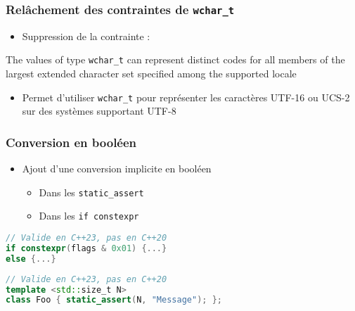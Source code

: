 \documentclass[C++.tex]{subfiles}
\begin{document}
\begin{frame}[fragile]
	\frametitle{Relâchement des contraintes de \lstinline|wchar_t|}
	\begin{itemize}
		\item Suppression de la contrainte :
	\end{itemize}		

	\begin{block}{}
		The values of type \lstinline|wchar_t| can represent distinct codes for all members of the largest extended character set specified among the supported locale
	\end{block}

	\begin{itemize}		
		\item Permet d'utiliser \lstinline|wchar_t| pour représenter les caractères UTF-16 ou UCS-2 sur des systèmes supportant UTF-8

	\end{itemize}
\end{frame}

\begin{frame}[fragile]
	\frametitle{Conversion en booléen}
	\begin{itemize}
		\item Ajout d'une conversion implicite en booléen
		\begin{itemize}
			\item Dans les \lstinline|static_assert|
			\item Dans les \lstinline|if constexpr|
		\end{itemize}
	\end{itemize}

	\begin{lstlisting}[language=C++]
// Valide en C++23, pas en C++20
if constexpr(flags & 0x01) {...}
else {...}\end{lstlisting}

	\begin{lstlisting}[language=C++]
// Valide en C++23, pas en C++20
template <std::size_t N>
class Foo {	static_assert(N, "Message"); };\end{lstlisting}
\end{frame}
\end{document}
